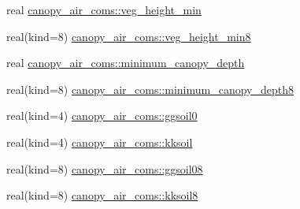 \begin{DoxyCompactItemize}
\item 
real \hyperlink{namespacecanopy__air__coms_ac23c06de9e56ff0ec7fe2ad917739b94}{canopy\+\_\+air\+\_\+coms\+::veg\+\_\+height\+\_\+min}
\item 
real(kind=8) \hyperlink{namespacecanopy__air__coms_a95554424abccff80dcf9ccc3a20b89bf}{canopy\+\_\+air\+\_\+coms\+::veg\+\_\+height\+\_\+min8}
\item 
real \hyperlink{namespacecanopy__air__coms_a99c058d51064878e734347335a373bf0}{canopy\+\_\+air\+\_\+coms\+::minimum\+\_\+canopy\+\_\+depth}
\item 
real(kind=8) \hyperlink{namespacecanopy__air__coms_ad5c4f0e54114b54fefc1ad1b9908459a}{canopy\+\_\+air\+\_\+coms\+::minimum\+\_\+canopy\+\_\+depth8}
\item 
real(kind=4) \hyperlink{namespacecanopy__air__coms_ac69a764f05bd0350e81b9b0dc1906fe6}{canopy\+\_\+air\+\_\+coms\+::ggsoil0}
\item 
real(kind=4) \hyperlink{namespacecanopy__air__coms_aafc2da976dc3ee14efea2a73b6218d88}{canopy\+\_\+air\+\_\+coms\+::kksoil}
\item 
real(kind=8) \hyperlink{namespacecanopy__air__coms_ace11cb0bb5a5d94330e33907db547ab1}{canopy\+\_\+air\+\_\+coms\+::ggsoil08}
\item 
real(kind=8) \hyperlink{namespacecanopy__air__coms_a05ce085ac25979fd0664f46be52b547d}{canopy\+\_\+air\+\_\+coms\+::kksoil8}
\end{DoxyCompactItemize}
